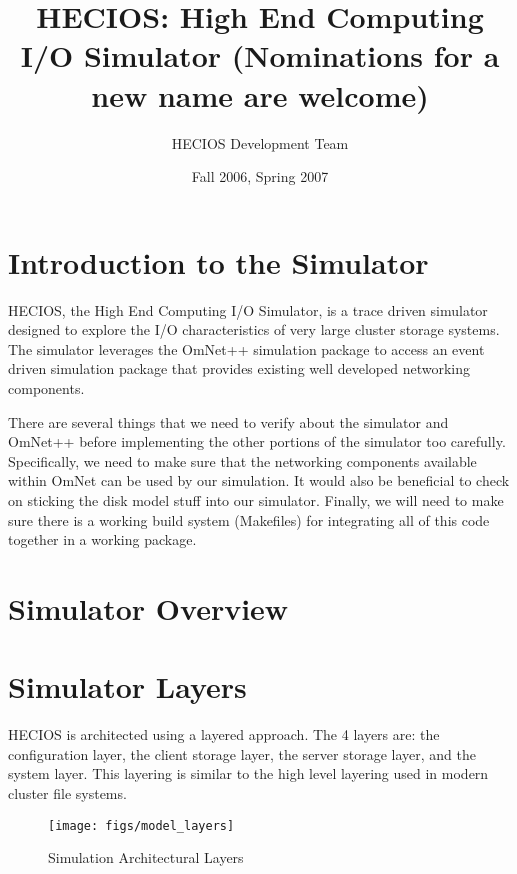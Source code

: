 \documentclass[11pt]{article}
\title{HECIOS: High End Computing I/O Simulator 
       (Nominations for a new name are welcome)}
\author{HECIOS Development Team}
\date{Fall 2006, Spring 2007}
\begin{document}
\maketitle
\newpage


%
%
\setlength{\parindent}{0pt}
\setlength{\parskip}{11pt}

%
%
\section{Introduction to the Simulator}
HECIOS, the High End Computing I/O Simulator, is a trace driven simulator
designed to explore the I/O characteristics of very large cluster storage
systems.  The simulator leverages the OmNet++ simulation package to access an
event driven simulation package that provides existing well developed
networking components.

There are several things that we need to verify about the simulator and
OmNet++ before implementing the other portions of the simulator too
carefully.  Specifically, we need to make sure that the networking components
available within OmNet can be used by our simulation.  It would also be
beneficial to check on sticking the disk model stuff into our simulator.
Finally, we will need to make sure there is a working build system (Makefiles)
for integrating all of this code together in a working package.

\section{Simulator Overview}

\section{Simulator Layers}
HECIOS is architected using a layered approach.  The 4 layers are: the
configuration layer, the client storage layer, the server storage layer, and
the system layer.  This layering is similar to the high level layering used in
modern cluster file systems.
 
\begin{figure}[t]
  \begin{center}
    \texttt{[image: figs/model\_layers]}
  \end{center}
  \caption{Simulation Architectural Layers \label{fig:model-layers}}
\end{figure}
\end{document}
